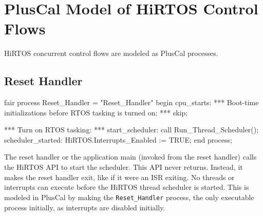 \documentclass[sigplan,anonymous,10pt]{acmart}
\begin{document}
\section{PlusCal Model of HiRTOS Control Flows}

HiRTOS concurrent control flows are modeled as PlusCal
processes.

\subsection{Reset Handler}
\begin{ppcal}
fair process Reset_Handler = "Reset_Handler"
begin
   cpu_starts:
   \* *** Boot-time initializations before RTOS tasking is turned on: ***
   skip;

   \* *** Turn on RTOS tasking: ***
   start_scheduler:
   call Run_Thread_Scheduler();
   scheduler_started:
   HiRTOS.Interrupts_Enabled := TRUE;
end process;
\end{ppcal}
\begin{tlatex}
%
\@x{ {\p@begin}}%
%
%
%
\@xx{}%
%
\@pvspace{8.0pt}%
%
%
\@xx{}%
%
%
%
%
\@x{ {\p@end} {\p@process} {\p@semicolon}}%
\end{tlatex}

The reset handler or the application main (invoked from the reset handler)
calls the HiRTOS API to start the scheduler.
This API never returns. Instead, it makes the reset handler exit, like if
it were an ISR exiting.
No threads or interrupts can execute before the HiRTOS
thread scheduler is started. 
This is modeled in PlusCal by making the \verb`Reset_Handler`
process, the only executable process initially, as interrupts are disabled
initially. 
\end{document}
